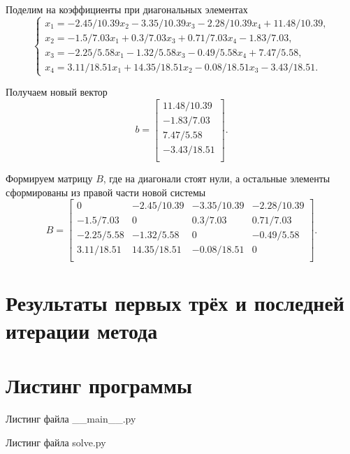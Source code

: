 Поделим на коэффициенты при диагональных элементах
$$ \begin{cases}
    x_1 = -2.45/10.39 x_2 - 3.35/10.39 x_3 - 2.28/10.39 x_4 + 11.48/10.39, \\
    x_2 = -1.5/7.03 x_1 + 0.3/7.03 x_3 + 0.71/7.03 x_4 - 1.83/7.03, \\
    x_3 = -2.25/5.58 x_1 - 1.32/5.58 x_3 - 0.49/5.58 x_4 + 7.47/5.58, \\
    x_4 = 3.11/18.51 x_1 + 14.35/18.51 x_2 - 0.08/18.51 x_3 - 3.43/18.51.
  \end{cases}$$

Получаем новый вектор
$$b =
\begin{bmatrix}
    11.48/10.39 \\
    -1.83/7.03 \\
    7.47/5.58 \\
    -3.43/18.51 \\
\end{bmatrix}.$$

Формируем матрицу $B$, где на диагонали стоят нули,
а остальные элементы сформированы из правой части новой системы
$$B =
  \begin{bmatrix}
      0 & -2.45/10.39 & -3.35/10.39 & -2.28/10.39 \\
      -1.5/7.03 & 0 & 0.3/7.03 & 0.71/7.03 \\
      -2.25/5.58& -1.32/5.58& 0 & -0.49/5.58 \\
      3.11/18.51 & 14.35/18.51 & -0.08/18.51 & 0 \\
  \end{bmatrix}.$$

\chapter{Результаты первых трёх и последней итерации метода}

\lstset{inputencoding=utf8, extendedchars=\true}


\chapter{Листинг программы}

Листинг файла \_\_main\_\_.py
\lstset{inputencoding=utf8, extendedchars=\true}


Листинг файла solve.py
\lstset{inputencoding=utf8, extendedchars=\true}


